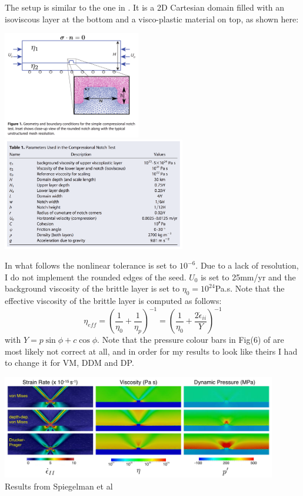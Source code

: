 The setup is similar to the one in \cite{spmw16}. It is a 2D Cartesian domain filled with an 
isoviscous layer at the bottom and a visco-plastic material on top, as shown here:  

\begin{center}
\includegraphics[width=6cm]{python_codes/fieldstone_39/images/spmw_1.png}
\includegraphics[width=8cm]{python_codes/fieldstone_39/images/spmw_2.png}
\end{center}


In what follows the nonlinear tolerance is set to $10^{-6}$. Due to a lack of resolution, I do not
implement the rounded edges of the seed. $U_0$ is set to 25mm/yr and the background viscosity of the brittle layer
is set to $\eta_0=10^{24}$Pa.s. Note that the effective viscosity of the brittle layer is computed as follows:
\[
\eta_{eff}
=\left( \frac{1}{\eta_0} + \frac{1}{\eta_p}  \right)^{-1}
=\left( \frac{1}{\eta_0} + \frac{2 \dot{\epsilon}_{ii}}{Y}  \right)^{-1}
\]
with $Y=p \sin \phi + c \cos \phi$. 
Note that the pressure colour bars in Fig(6) of \cite{spmw16} are most likely not correct at all, 
and in order for my results to look like theirs I had to change it for VM, DDM and DP. 

\begin{center}
\includegraphics[width=12cm]{python_codes/fieldstone_39/images/spmw_3.png}\\
{\small Results from Spiegelman et al \cite{spmw16}}
\end{center}

